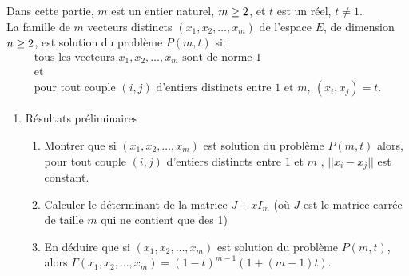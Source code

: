 Dans cette partie, $m$ est un entier naturel, $m\geq 2$, et $t$ est
un réel, $t\neq1$.\\
La famille de $m$ vecteurs distincts $(x_1,x_2,\dots,x_m)$ de
l'espace $E$, de dimension $n\geq2$, est solution du problème
$P(m,t)$ si :
$$\begin{array}{c}
    \text{tous les vecteurs } x_1,x_2,\dots,x_m \text{ sont de norme } 1 \\
    \text{et} \\
    \text{pour tout couple } (i,j) \text{ d'entiers distincts entre }
    1 \text{ et } m,\ (x_i,x_j)=t.
  \end{array}$$
  \begin{enumerate}
    \item Résultats préliminaires
     \begin{enumerate}
                                    \item Montrer que si
                                    $(x_1,x_2,\dots,x_m)$ est
                                    solution du problème $P(m,t)$
                                    alors, pour tout couple $(i,j)$
                                    d'entiers distincts entre $1$ et
                                    $m$ , $||x_i-x_j||$ est
                                    constant.
                                    \item Calculer le déterminant de la matrice $J+xI_m$ (où $J$ est le matrice carrée de taille $m$
qui ne contient que des 1)
                                    \item En déduire que si $(x_1,x_2,\dots,x_m)$
                                    est solution du problème
                                    $P(m,t)$, alors
                                    $\Gamma(x_1,x_2,\dots,x_m)=(1-t)^{m-1}(1+(m-1)t).$


\end{enumerate}
\end{enumerate}

